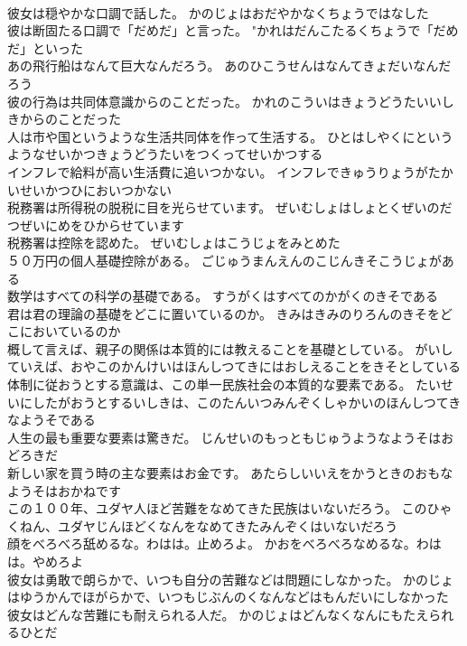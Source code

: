 \documentclass[8pt]{extreport}
\begin{document}
\begin{CJK}{UTF8}{min}
\\	彼女は穏やかな口調で話した。	かのじょはおだやかなくちょうではなした 
\\	彼は断固たる口調で「だめだ」と言った。	"かれはだんこたるくちょうで「だめだ」といった 
\\	あの飛行船はなんて巨大なんだろう。	あのひこうせんはなんてきょだいなんだろう 
\\	彼の行為は共同体意識からのことだった。	かれのこういはきょうどうたいいしきからのことだった 
\\	人は市や国というような生活共同体を作って生活する。	ひとはしやくにというようなせいかつきょうどうたいをつくってせいかつする 
\\	インフレで給料が高い生活費に追いつかない。	インフレできゅうりょうがたかいせいかつひにおいつかない 
\\	税務署は所得税の脱税に目を光らせています。	ぜいむしょはしょとくぜいのだつぜいにめをひからせています 
\\	税務署は控除を認めた。	ぜいむしょはこうじょをみとめた 
\\	５０万円の個人基礎控除がある。	ごじゅうまんえんのこじんきそこうじょがある 
\\	数学はすべての科学の基礎である。	すうがくはすべてのかがくのきそである 
\\	君は君の理論の基礎をどこに置いているのか。	きみはきみのりろんのきそをどこにおいているのか 
\\	概して言えば、親子の関係は本質的には教えることを基礎としている。	がいしていえば、おやこのかんけいはほんしつてきにはおしえることをきそとしている 
\\	体制に従おうとする意識は、この単一民族社会の本質的な要素である。	たいせいにしたがおうとするいしきは、このたんいつみんぞくしゃかいのほんしつてきなようそである 
\\	人生の最も重要な要素は驚きだ。	じんせいのもっともじゅうようなようそはおどろきだ 
\\	新しい家を買う時の主な要素はお金です。	あたらしいいえをかうときのおもなようそはおかねです 
\\	この１００年、ユダヤ人ほど苦難をなめてきた民族はいないだろう。	このひゃくねん、ユダヤじんほどくなんをなめてきたみんぞくはいないだろう 
\\	顔をべろべろ舐めるな。わはは。止めろよ。	かおをべろべろなめるな。わはは。やめろよ 
\\	彼女は勇敢で朗らかで、いつも自分の苦難などは問題にしなかった。	かのじょはゆうかんでほがらかで、いつもじぶんのくなんなどはもんだいにしなかった 
\\	彼女はどんな苦難にも耐えられる人だ。	かのじょはどんなくなんにもたえられるひとだ 

\end{CJK}
\end{document}
